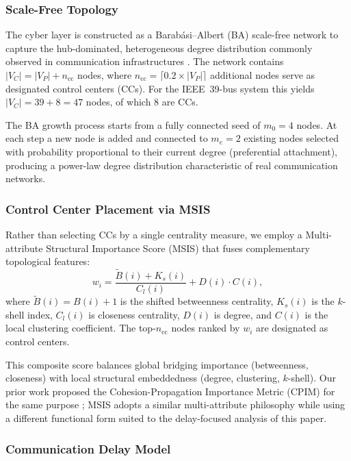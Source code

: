 \documentclass[a4paper,fleqn]{cas-dc}
\begin{document}
\subsubsection{Scale-Free Topology}

The cyber layer is constructed as a Barab\'{a}si--Albert (BA) scale-free
network to capture the hub-dominated, heterogeneous degree distribution
commonly observed in communication infrastructures
\citep{BarabasiAlbert1999}.  The network contains
$|V_C|=|V_P|+n_{\text{cc}}$ nodes, where
$n_{\text{cc}}=\lceil 0.2\times|V_P|\rceil$ additional nodes serve as
designated control centers (CCs).  For the IEEE~39-bus system this
yields $|V_C|=39+8=47$ nodes, of which 8 are CCs.

The BA growth process starts from a fully connected seed of $m_0=4$
nodes.  At each step a new node is added and connected to $m_e=2$
existing nodes selected with probability proportional to their current
degree (preferential attachment), producing a power-law degree
distribution characteristic of real communication networks.

\subsubsection{Control Center Placement via MSIS}\label{sec:msis}

Rather than selecting CCs by a single centrality measure, we employ a
Multi-attribute Structural Importance Score (MSIS) that fuses
complementary topological features:
\begin{equation}\label{eq:msis}
  w_i = \frac{\widetilde{B}(i)+K_s(i)}{C_l(i)} + D(i)\cdot C(i),
\end{equation}
where $\widetilde{B}(i)=B(i)+1$ is the shifted betweenness centrality,
$K_s(i)$ is the $k$-shell index, $C_l(i)$ is closeness centrality,
$D(i)$ is degree, and $C(i)$ is the local clustering coefficient.  The
top-$n_{\text{cc}}$ nodes ranked by $w_i$ are designated as control
centers.

This composite score balances global bridging importance (betweenness,
closeness) with local structural embeddedness (degree, clustering,
$k$-shell).  Our prior work proposed the Cohesion-Propagation Importance
Metric (CPIM) for the same purpose \citep{ChenTu2026}; MSIS adopts a
similar multi-attribute philosophy while using a different functional
form suited to the delay-focused analysis of this paper.

\subsubsection{Communication Delay Model}\label{sec:delay_model}
\end{document}

